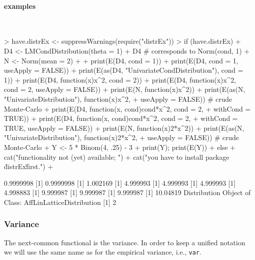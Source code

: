 \documentclass[11pt]{article}
\newcommand{\code}[1]{{\tt #1}}
\begin{document}
\paragraph{examples} $ \mbox{ }$\newline
\begin{Schunk}
\begin{Sinput}
> have.distrEx <- suppressWarnings(require("distrEx"))
> if (have.distrEx) 
+     {D4 <- LMCondDistribution(theta = 1)
+      D4  # corresponds to Norm(cond, 1)
+      N <- Norm(mean = 2)
+ 
+      print(E(D4, cond = 1))
+      print(E(D4, cond = 1, useApply = FALSE))
+      print(E(as(D4, "UnivariateCondDistribution"), cond = 1))
+      print(E(D4, function(x){x^2}, cond = 2))
+      print(E(D4, function(x){x^2}, cond = 2, useApply = FALSE))
+      print(E(N, function(x){x^2}))
+      print(E(as(N, "UnivariateDistribution"), function(x){x^2},
+        useApply = FALSE)) # crude Monte-Carlo
+      print(E(D4, function(x, cond){cond*x^2}, cond = 2,
+        withCond = TRUE))
+      print(E(D4, function(x, cond){cond*x^2}, cond = 2,
+        withCond = TRUE, useApply = FALSE))
+      print(E(N, function(x){2*x^2}))
+      print(E(as(N, "UnivariateDistribution"), function(x){2*x^2},
+        useApply = FALSE)) # crude Monte-Carlo
+      Y <- 5 * Binom(4, .25) - 3
+      print(Y); print(E(Y))  
+     } else {
+     cat("\n functionality not (yet) available; ")
+     cat("you have to install package \"distrEx\" first.\n")
+     }
\end{Sinput}
\begin{Soutput}
[1] 0.9999998
[1] 0.9999998
[1] 1.002169
[1] 4.999993
[1] 4.999993
[1] 4.999993
[1] 4.998883
[1] 9.999987
[1] 9.999987
[1] 9.999987
[1] 10.04819
Distribution Object of Class: AffLinLatticeDistribution
[1] 2
\end{Soutput}
\end{Schunk}
%
%
\subsubsection{Variance}
The next-common functional is the variance. In order to keep a unified
notation we will use the same name as for the empirical variance, i.e.,
 \code{var}.
\end{document}
